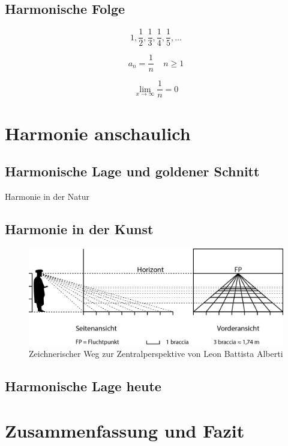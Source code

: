 \documentclass[12pt,a4paper]{article}
\begin{document}
\subsection{Harmonische Folge}

\[ 1, \dfrac{1}{2}, \dfrac{1}{3}, \dfrac{1}{4}, \dfrac{1}{5}, \dots\]

\[ a_n = \dfrac{1}{n} ~~~~~ n \geq 1\]

\[ \lim_{x \to \infty} \dfrac{1}{n} = 0\]

\newpage
\section{Harmonie anschaulich}

\subsection{Harmonische Lage und goldener Schnitt}
Harmonie in der Natur

\subsection{Harmonie in der Kunst}

\begin{figure}[htbp] 
\centering
\includegraphics[width=\textwidth]{Bilder/braccia.png}
\caption{Zeichnerischer Weg zur Zentralperspektive von Leon Battista Alberti}
\label{fig:braccia}
\end{figure}

\subsection{Harmonische Lage heute}

\newpage
\section{Zusammenfassung und Fazit}

\newpage
\listoffigures

\newpage
{}


\end{document}
